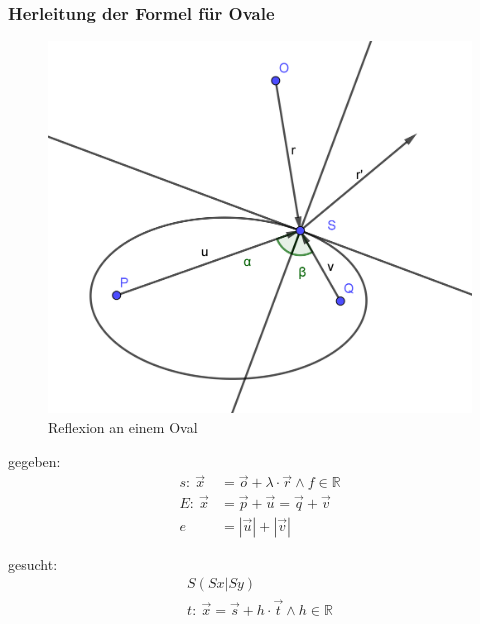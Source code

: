 \documentclass[reducespace,stylepage,semiarbeit]{spezidoc}
\begin{document}
\newpage
\subsubsection*{Herleitung der Formel für Ovale}

\begin{figure}[h]
\centering
\includegraphics[scale=1]{pictures/OvalRef.png}
\caption{Reflexion an einem Oval}
\end{figure}

gegeben:
\begin{subequations}
\begin{align}
s:~ \vec{x} &= \vec{o} + \lambda \cdot \vec{r} \wedge f \in \mathds{R} \nonumber \\
E:~ \vec{x} &= \vec{p} + \vec{u} = \vec{q} + \vec{v} \nonumber  \\
e &= |\vec{u}| + |\vec{v}| \nonumber
\end{align}
\end{subequations}

gesucht:
\begin{subequations}
\begin{align}
S(Sx|Sy)~~~~~~~~~~ \nonumber  \\
t:~ \vec{x} = \vec{s} + h \cdot \vec{t} \wedge h \in \mathds{R} \nonumber 
\end{align}
\end{subequations}
\end{document}
